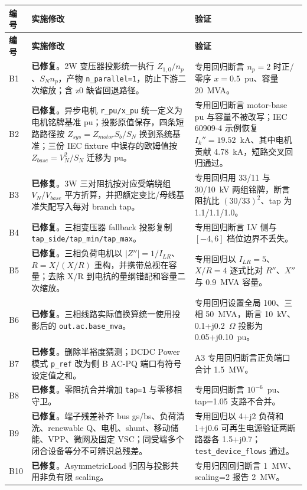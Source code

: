 \documentclass[11pt,a4paper,fontset=fandol]{ctexart}
\newcommand{\file}[1]{\texttt{#1}}
\newcommand{\fixed}{\textcolor{hygreen}{\textbf{已修复}}}
\begin{document}
\begin{footnotesize}
\begin{longtable}{@{}p{0.7cm}p{8.4cm}p{6.0cm}@{}}
\toprule
\textbf{编号} & \textbf{实施修改} & \textbf{验证}\\
\midrule
\endfirsthead
\toprule
\textbf{编号} & \textbf{实施修改} & \textbf{验证}\\
\midrule
\endhead
B1 & \fixed{}。2W 变压器投影统一执行 $Z_{1,0}/n_p$、$S_N n_p$，产物 \file{n\_parallel=1}，防止下游二次缩放；含 z0 缺省回退路径。 & 专用回归断言 $n_p=2$ 时正/零序 $x=0.5$~pu、容量 20~MVA。\\
B2 & \fixed{}。异步电机 \file{r\_pu/x\_pu} 统一定义为电机铭牌基准 pu；投影原值保存，四条短路路径按 $Z_{sys}=Z_{motor}S_b/S_N$ 换到系统基准；三份 IEC fixture 中误存的欧姆值按 $Z_{base}=V_N^2/S_N$ 迁移为 pu。 & 专用回归断言 motor-base pu 与容量不被改写；IEC 60909-4 示例恢复 $I_k''=19.52$~kA、其中电机贡献 4.78~kA，短路交叉回归通过。\\
B3 & \fixed{}。3W 三对阻抗按对应受端绕组 $V_N/V_{base}$ 平方折算，并把额定变比/母线基准失配写入每对 branch tap。 & 专用回归用 33/11 与 30/10~kV 两组铭牌，断言阻抗比 $(30/33)^2$、tap 为 1.1/1.1/1.0。\\
B4 & \fixed{}。三相变压器 fallback 投影复制 \file{tap\_side/tap\_min/tap\_max}。 & 专用回归断言 LV 侧与 $[-4,6]$ 档位边界不丢失。\\
B5 & \fixed{}。三相负荷电机以 $|Z''|=1/I_{LR}$、$R=X/(X/R)$ 重构，并携带总视在容量；去除 X/R 到电抗的量纲错配和容量二次缩放。 & 专用回归以 $I_{LR}=5$、$X/R=4$ 逐式比对 $R''$、$X''$ 与 0.9~MVA 容量。\\
B6 & \fixed{}。三相线路实际值换算统一使用投影后的 \file{out.ac.base\_mva}。 & 专用回归设置全局 100、三相 50~MVA，断言 10~kV、0.1+j0.2~$\Omega$ 投影为 0.05+j0.10~pu。\\
B7 & \fixed{}。删除半裕度猜测；DCDC Power 模式 \file{p\_ref} 改为侧 B AC-PQ 端口有符号设定值之和。 & A3 专用回归断言正负端口合计 1.5~MW。\\
B8 & \fixed{}。零阻抗合并增加 \file{tap=1} 与零移相守卫。 & 专用回归断言 $10^{-6}$~pu、tap=1.05 支路不合并。\\
B9 & \fixed{}。端子残差补齐 bus gs/bs、负荷清洗、renewable Q、电机、shunt、移动储能、VPP、微网及固定 VSC；同受端多个闭合设备等分不可辨识总残差。 & 专用回归以 4+j2 负荷和 1+j0.6 可再生电源验证两断路器各 1.5+j0.7；\file{test\_device\_flows} 通过。\\
B10 & \fixed{}。AsymmetricLoad 归因与投影共用非负有限 scaling。 & 专用归因回归断言 1~MW、scaling=2 报告 2~MW。\\

\end{longtable}
\end{footnotesize}
\end{document}
